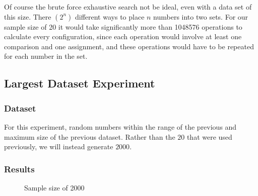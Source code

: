 \documentclass[a4paper]{article}
\begin{document}
Of course the brute force exhaustive search not be ideal, even with a data set of this size. 
There $(2^n)$ different ways to place $n$ numbers into two sets.
For our sample size of 20 it would take significantly 
more than 1048576 operations to calculate every configuration,
since each operation would involve at least one comparison and one assignment,
and these operations would have to be repeated for each number in the set.



\newpage



\subsection{Largest Dataset Experiment}


\subsubsection{Dataset}

For this experiment, random numbers within the range of the previous and maximum size 
of the previous dataset. Rather than the $20$ that were used previously, we will instead 
generate $2000$.

\subsubsection{Results}

\begin{figure}[h]
  
\centering
\caption{Sample size of 2000}
\label{fig:x Mutation Plot}

\end{figure}
\end{document}
